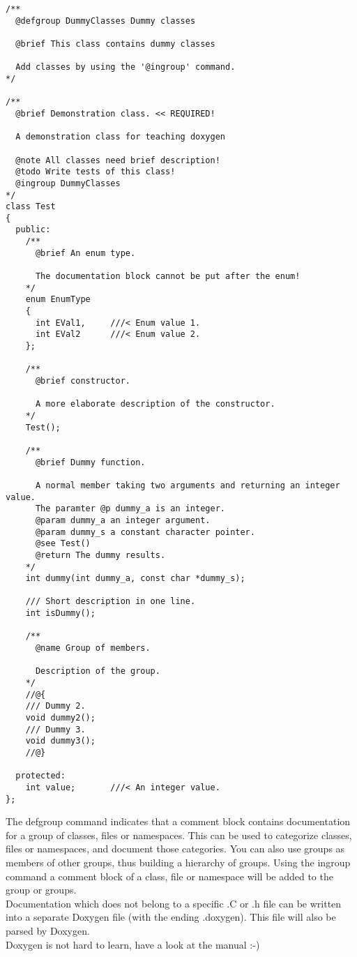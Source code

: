 \documentclass[a4]{article}
\begin{document}
\begin{verbatim}
/**
  @defgroup DummyClasses Dummy classes
	
  @brief This class contains dummy classes
	
  Add classes by using the '@ingroup' command. 
*/

/**
  @brief Demonstration class. << REQUIRED!
  
  A demonstration class for teaching doxygen
  
  @note All classes need brief description!
  @todo Write tests of this class!
  @ingroup DummyClasses
*/
class Test
{
  public:
    /** 
      @brief An enum type. 
      
      The documentation block cannot be put after the enum! 
    */
    enum EnumType
    {
      int EVal1,     ///< Enum value 1.
      int EVal2      ///< Enum value 2.
    };
    
    /**
      @brief constructor.
      
      A more elaborate description of the constructor.
    */
    Test();

    /** 
      @brief Dummy function.
      
      A normal member taking two arguments and returning an integer value.
      The paramter @p dummy_a is an integer.
      @param dummy_a an integer argument.
      @param dummy_s a constant character pointer.
      @see Test()
      @return The dummy results.
    */
    int dummy(int dummy_a, const char *dummy_s);
    
    /// Short description in one line.
    int isDummy();

    /** 
      @name Group of members.
      
      Description of the group.
    */
    //@{
    /// Dummy 2.
    void dummy2();
    /// Dummy 3.
    void dummy3();
    //@}
    
  protected:
    int value;       ///< An integer value.
};
\end{verbatim}
The defgroup command indicates that a comment block contains documentation for a group of classes, files or namespaces.
This can be used to categorize classes, files or namespaces, and document those categories. 
You can also use groups as members of other groups, thus building a hierarchy of groups. 
Using the ingroup command a comment block of a class, file or namespace will be added to the group or groups.\\
Documentation which does not belong to a specific .C or .h file can be written into a 
separate Doxygen file (with the ending .doxygen). This file will also be parsed by Doxygen.\\
Doxygen is not hard to learn, have a look at the manual :-)
\end{document}
